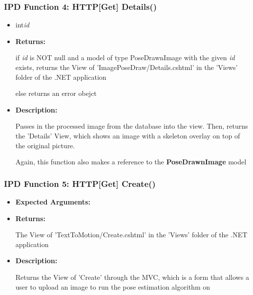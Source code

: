 \documentclass{scrreprt}
\begin{document}
\subsubsection{IPD Function 4: HTTP[Get] Details()}

\begin{itemize}
        \item int\quad\textit{id}

        \item \textbf{Returns:}

                if \textit{id} is NOT null and a model of type PoseDrawnImage
                with the given \textit{id} exists, returns the View of
                'ImagePoseDraw/Details.cshtml' in the 'Views' folder of the
                .NET application

                else returns an error obejct

        \item \textbf{Description:}

                Passes in the processed image from the database into the view.
                Then, returns the 'Details' View, which shows an image with a
                skeleton overlay on top of the original picture.

                Again, this function also makes a reference to the
                \textbf{PoseDrawnImage} model
\end{itemize}


\subsubsection{IPD Function 5: HTTP[Get] Create()}

\begin{itemize}
        \item \textbf{Expected Arguments:}
        \item \textbf{Returns:}

                The View of 'TextToMotion/Create.cshtml' in the 'Views' folder of the .NET
                application

        \item \textbf{Description:}

                Returns the View of 'Create' through the MVC, which is a form that allows a
                user to upload an image to run the pose estimation algorithm on
\end{itemize}
\end{document}

